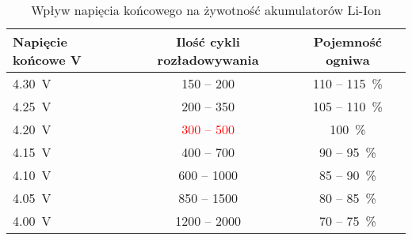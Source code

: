 		\begin{table}[H]
			\centering
			\begin{tabular}{|l|c|c|} \hline
				Napięcie końcowe \unit{V} & Ilość cykli rozładowywania & Pojemność ogniwa \\
				\hline
				\hline \SI{4.30}{\volt} & 150 -- 200 & 110 -- \SI{115}{\percent}\\
				\hline \SI{4.25}{\volt}	& 200 -- 350 & 105 -- \SI{110}{\percent}\\
				\hline \SI{4.20}{\volt}	& \textcolor{red}{300 -- 500} & \SI{100}{\percent}\\
				\hline \SI{4.15}{\volt}	& 400 -- 700 & 90 -- \SI{95}{\percent} \\
				\hline \SI{4.10}{\volt}	& 600 -- 1000 & 85 -- \SI{90}{\percent}\\
				\hline \SI{4.05}{\volt} & 850 -- 1500 & 80 -- \SI{85}{\percent}\\
				\hline \SI{4.00}{\volt} & 1200 -- 2000 & 70 -- \SI{75}{\percent}\\
				\hline
			\end{tabular}
			\caption{Wpływ napięcia końcowego na żywotność akumulatorów Li-Ion}
			\label{tab:napięcieKońcoweLiIon}
		\end{table}
	
